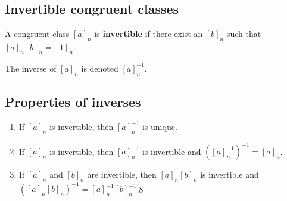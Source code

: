 \documentclass[preview]{standalone}
\begin{document}


\subsection{Invertible congruent classes}

A congruent class \({[a]}_n\) is \textbf{invertible}
if there exist an \({[b]}_n\) such that \({[a]}_n{[b]}_n={[1]}_n\).

The inverse of \({[a]}_n\) is denoted \({[a]}_n^{-1}\).

\subsection{Properties of inverses}

\begin{enumerate}
    \item If \({[a]}_n\) is invertible, then \({[a]}_n^{-1}\) is unique.
    \item If \({[a]}_n\) is invertible, then \({[a]}_n^{-1}\) is invertible and \(({[a]}_n^{-1})^{-1}={[a]}_n\).
    \item If \({[a]}_n\) and \({[b]}_n\) are invertible, then \({[a]}_n{[b]}_n\) is invertible and
    \({({[a]}_n{[b]}_n)}^{-1} = {[a]}_n^{-1}{[b]}_n^{-1}\).8
\end{enumerate}



\end{document}
